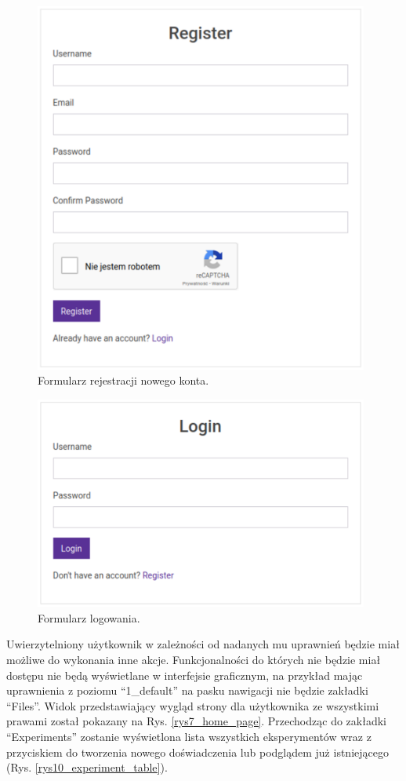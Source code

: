 \begin{figure}[htb]
	\centering
	\includegraphics[width=11cm]{grafika/registery_form.eps}
	\caption{Formularz rejestracji nowego konta.}
	\label{rys8_registery_form}
\end{figure}

\begin{figure}[htb]
	\centering
	\includegraphics[width=11cm]{grafika/login_form.eps}
	\caption{Formularz logowania.}
	\label{rys9_login_form}
\end{figure}

Uwierzytelniony użytkownik w zależności od nadanych mu uprawnień będzie miał możliwe do wykonania inne akcje. 
Funkcjonalności do których nie będzie miał dostępu nie będą wyświetlane w interfejsie graficznym, na przykład mając uprawnienia z poziomu \enquote{1\_default} na pasku nawigacji nie będzie zakładki \enquote{Files}. Widok przedstawiający wygląd strony dla użytkownika ze wszystkimi prawami został pokazany na Rys. \ref{rys7_home_page}. Przechodząc do zakładki \enquote{Experiments} zostanie wyświetlona lista wszystkich eksperymentów wraz z przyciskiem do tworzenia nowego doświadczenia lub podglądem już istniejącego (Rys. \ref{rys10_experiment_table}). 

